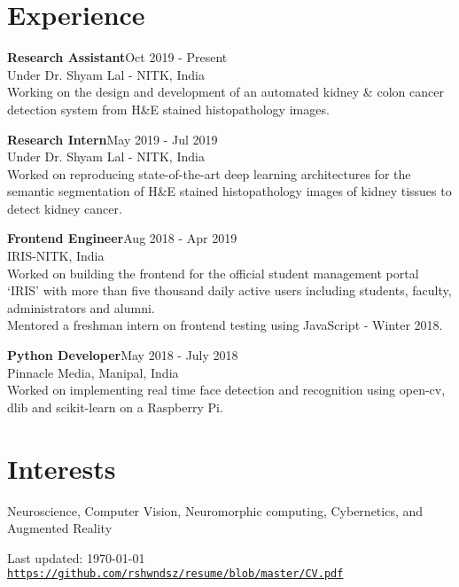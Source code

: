 \documentclass[letterpaper]{article}
\def\footerlink{https://github.com/rshwndsz/resume/blob/master/CV.pdf}
\renewenvironment{itemize}{
  \begin{list}{}{
    \setlength{\leftmargin}{1.5em}
  }
}{
  \end{list}
}
\newcommand{\datefont}[1]{\textcolor{black!80}{\small{#1}}}
\begin{document}
\section*{Experience}
  \begin{itemize}
    \item \textbf{Research Assistant}\hfill{\textcolor{black!80}{\small{Oct 2019 - Present}}}\\
    \datefont{Under Dr. Shyam Lal - NITK, India}\\
    Working on the design and development of an automated kidney \& colon cancer detection system from H\&E stained histopathology images.

    \item \textbf{Research Intern}\hfill{\textcolor{black!80}{\small{May 2019 - Jul 2019}}}\\
    \datefont{Under Dr. Shyam Lal - NITK, India}\\
    Worked on reproducing state-of-the-art deep learning architectures for the semantic segmentation of H\&E stained histopathology images of kidney tissues to detect kidney cancer.

    \item \textbf{Frontend Engineer}\hfill{\textcolor{black!80}{\small{Aug 2018 - Apr 2019}}}\\
    \datefont{IRIS-NITK, India}\\
    Worked on building the frontend for the official student management portal `IRIS' with more than five thousand daily active users including students, faculty, administrators and alumni.\\
    Mentored a freshman intern on frontend testing using JavaScript - Winter 2018.

    \item \textbf{Python Developer}\hfill{\textcolor{black!80}{\small{May 2018 - July 2018}}}\\
    \datefont{Pinnacle Media, Manipal, India}\\
    Worked on implementing real time face detection and recognition using open-cv, dlib and scikit-learn on a Raspberry Pi.
  \end{itemize}


\section*{Interests}
  \begin{itemize}
    \item Neuroscience, Computer Vision, Neuromorphic computing, Cybernetics, and Augmented Reality
  \end{itemize}


\bigskip
\begin{center}
  \begin{footnotesize}
    Last updated: \today \\
    \href{\footerlink}{\texttt{\footerlink}}
  \end{footnotesize}
\end{center}
\end{document}
